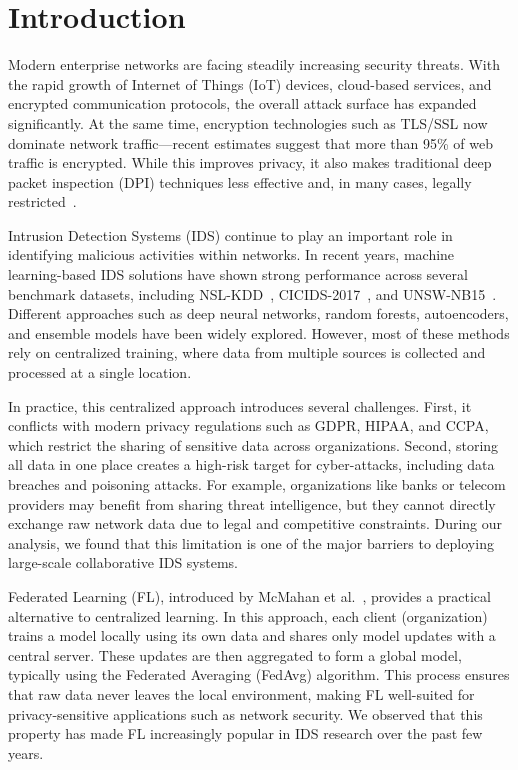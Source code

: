 \documentclass[conference]{IEEEtran}
\begin{document}
\section{Introduction}

Modern enterprise networks are facing steadily increasing security threats. With the rapid growth of Internet of Things (IoT) devices, cloud-based services, and encrypted communication protocols, the overall attack surface has expanded significantly. At the same time, encryption technologies such as TLS/SSL now dominate network traffic—recent estimates suggest that more than 95\% of web traffic is encrypted. While this improves privacy, it also makes traditional deep packet inspection (DPI) techniques less effective and, in many cases, legally restricted~\cite{ferriyan2021}.

Intrusion Detection Systems (IDS) continue to play an important role in identifying malicious activities within networks. In recent years, machine learning-based IDS solutions have shown strong performance across several benchmark datasets, including NSL-KDD~\cite{tavallaee2009}, CICIDS-2017~\cite{sharafaldin2018}, and UNSW-NB15~\cite{moustafa2015}. Different approaches such as deep neural networks, random forests, autoencoders, and ensemble models have been widely explored. However, most of these methods rely on centralized training, where data from multiple sources is collected and processed at a single location.

In practice, this centralized approach introduces several challenges. First, it conflicts with modern privacy regulations such as GDPR, HIPAA, and CCPA, which restrict the sharing of sensitive data across organizations. Second, storing all data in one place creates a high-risk target for cyber-attacks, including data breaches and poisoning attacks. For example, organizations like banks or telecom providers may benefit from sharing threat intelligence, but they cannot directly exchange raw network data due to legal and competitive constraints. During our analysis, we found that this limitation is one of the major barriers to deploying large-scale collaborative IDS systems.

Federated Learning (FL), introduced by McMahan et al.~\cite{mcmahan2017}, provides a practical alternative to centralized learning. In this approach, each client (organization) trains a model locally using its own data and shares only model updates with a central server. These updates are then aggregated to form a global model, typically using the Federated Averaging (FedAvg) algorithm. This process ensures that raw data never leaves the local environment, making FL well-suited for privacy-sensitive applications such as network security. We observed that this property has made FL increasingly popular in IDS research over the past few years.
\end{document}
